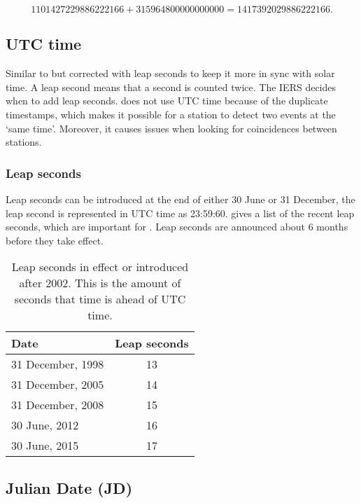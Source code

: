 \begin{equation}
    \num{1101427229886222166} + \num{315964800000000000} =
        \num{1417392029886222166}.
\end{equation}


\subsection{UTC time}

Similar to \gps but corrected with leap seconds to keep it more in sync
with solar time. A leap second means that a second is counted twice. The
IERS decides when to add leap seconds. \hisparc does not use UTC time
because of the duplicate timestamps, which makes it possible for a
station to detect two events at the `same time'. Moreover, it causes
issues when looking for coincidences between stations.


\subsubsection{Leap seconds}

Leap seconds can be introduced at the end of either 30 June or 31
December, the leap second is represented in UTC time as 23:59:60.
 gives a list of the recent leap seconds,
which are important for \hisparc. Leap seconds are announced about 6
months before they take effect.

\begin{table}
    \centering
    \begin{tabular}{ l | c }
        Date & Leap seconds \\
        \hline
        31 December, 1998 & 13 \\
        31 December, 2005 & 14 \\
        31 December, 2008 & 15 \\
        30 June, 2012 & 16 \\
        30 June, 2015 & 17 \\
        \hline
    \end{tabular}
   \caption{Leap seconds in effect or introduced after 2002. This is the
            amount of seconds that \gps time is ahead of UTC time.}
   \label{table:leapseconds}
\end{table}


\subsection{Julian Date (JD)}

